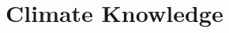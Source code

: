 \documentclass[aspectratio=169,9pt,dvipsnames]{beamer}
\begin{document}
\section{Climate Knowledge}

\end{document}
